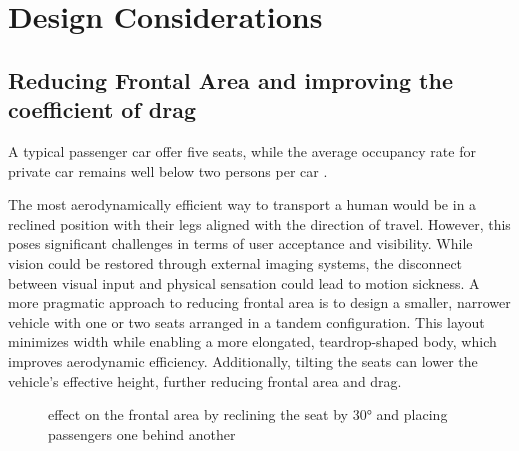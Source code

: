 \section{Design Considerations}

\subsection{Reducing Frontal Area and improving the coefficient of drag}

A typical passenger car offer five seats, while the average occupancy rate for private car remains well below two persons per car \cite{ceu_move_study_2022}.

The most aerodynamically efficient way to transport a human would be in a reclined position with their legs aligned with the direction of travel. However, this poses significant challenges in terms of user acceptance and visibility. While vision could be restored through external imaging systems, the disconnect between visual input and physical sensation could lead to motion sickness. A more pragmatic approach to reducing frontal area is to design a smaller, narrower vehicle with one or two seats arranged in a tandem configuration. This layout minimizes width while enabling a more elongated, teardrop-shaped body, which improves aerodynamic efficiency. Additionally, tilting the seats can lower the vehicle’s effective height, further reducing frontal area and drag.


\begin{figure}[h!]
    \centering
    \hfill
    \caption{effect on the frontal area by reclining the seat by 30° and placing passengers one behind another}
    \label{fig:FrontaAreaGraphicsComparison}
\end{figure}

